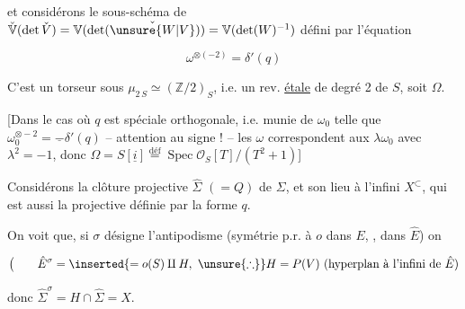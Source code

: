 
et considérons le sous-schéma de $\check{\mathbb V}(\det\check V)=\mathbb V(\det(\check{\unsure{W|V}}))=\mathbb V(\det(W)^{-1})$ défini par l'équation

\[
\omega^{\otimes(-2)}=\delta'(q)
\]

C'est un torseur sous $\mu_{2\,S}\simeq(\mathbb Z/2)_S$, i.e. un rev. \uline{étale} de degré 2 de $S$, soit $\Omega$.



[Dans le cas où $q$ est spéciale orthogonale, i.e. munie de $\omega_0$ telle que $\omega_0^{\otimes-2}=\underline{-}\delta'(q)$ -- attention au signe ! -- les $\omega$ correspondent aux $\lambda\omega_0$ avec $\lambda^2=-1$, donc $\Omega=S[\underline i]\overset{\text{déf}}{=}\operatorname{Spec}\mathcal O_S[T]/(T^2+1)$]

Considérons la clôture projective $\hat\Sigma$ $(=Q)$ de $\Sigma$, et \deleted{\unsure{$\Sigma$}} son lieu à l'infini $X^{\subset}$, qui est aussi la  projective  définie par la forme $q$.

On voit que, \deleted{\unsure{$\Sigma$}} si $\sigma$ désigne l'antipodisme (symétrie p.r. à $o$ dans $E$, , dans $\hat E$) on

\[
\bigl(\qquad\hat E^\sigma=\inserted{=o(S)\amalg H,\ \unsure{\therefore}} H=P(V)\text{ (hyperplan à l'infini de }\hat E)
\]

donc $\hat\Sigma^\sigma=H\cap\hat\Sigma=X$.

